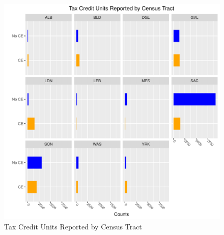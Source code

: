 \documentclass{article}\usepackage[]{graphicx}\usepackage[]{color}
\makeatletter
\def\maxwidth{ %
  \ifdim\Gin@nat@width>\linewidth
    \linewidth
  \else
    \Gin@nat@width
  \fi
}
\newenvironment{knitrout}{}{} %
\makeatother
\begin{document}
\begin{knitrout}
\color{fgcolor}\begin{figure}
\includegraphics[width=\maxwidth]{figure/MultiPlot_Tax_Units_Counts-1} \caption[Tax Credit Units Reported by Census Tract]{Tax Credit Units Reported by Census Tract}\label{fig:MultiPlot_Tax_Units_Counts}
\end{figure}


\end{knitrout}
\end{document}
